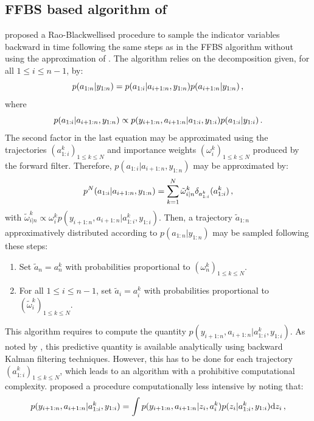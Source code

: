 \subsection{FFBS based algorithm of \cite{lindsten:bunch:sarkka:schon:godsill:2015,sarkka:bunch:godsill:2012,lindsten:bunch:godsill:schon:2013}}
\cite{lindsten:bunch:sarkka:schon:godsill:2015,sarkka:bunch:godsill:2012,lindsten:bunch:godsill:schon:2013} proposed a Rao-Blackwellised procedure to sample the indicator variables backward in time following the same steps as in the FFBS algorithm without using the approximation of \cite{kim:1994}. The algorithm relies on the decomposition given, for all $1\le i \le n-1$, by:
\[
p(a_{1:n}|y_{1:n}) = p(a_{1:i}|a_{i+1:n},y_{1:n})p(a_{i+1:n}|y_{1:n})\,,
\]
where
\[
p(a_{1:i}|a_{i+1:n},y_{1:n}) \propto p(y_{i+1:n},a_{i+1:n}|a_{1:i},y_{1:i})p(a_{1:i}|y_{1:i})\,.
\]
The second factor in the last equation may be approximated using the trajectories $(a^k_{1:i})_{1\le k \le N}$ and importance weights $(\omega^k_{i})_{1\le k \le N}$ produced by the forward filter. Therefore, $p(a_{1:i}|a_{i+1:n},y_{1:n})$ may be approximated by:
\[
p^N(a_{1:i}|a_{i+1:n},y_{1:n}) = \sum_{k=1}^N \tilde{\omega}^k_{i|n}\delta_{a^k_{1:i}}(a^k_{1:i})\,,
\]
with $\tilde{\omega}^k_{i|n} \propto \omega_i^k p(y_{i+1:n},a_{i+1:n}|a^k_{1:i},y_{1:i})$. Then, a trajectory $\tilde{a}_{1:n}$ approximatively distributed according to $p(a_{1:n}|y_{1:n})$ may be sampled following these steps:
\begin{enumerate}[-]
\item Set $\tilde{a}_n= a_n^k$ with probabilities proportional to $(\omega_n^k)_{1\le k \le N}$.
\item For all $1\le i\le n-1$, set $\tilde{a}_i = a_i^k$ with probabilities proportional to $(\tilde{\omega}_i^k)_{1\le k \le N}$.
\end{enumerate}
This algorithm requires to compute the quantity  $p(y_{i+1:n},a_{i+1:n}|a^k_{1:i},y_{1:i})$. As noted by \cite{lindsten:bunch:sarkka:schon:godsill:2015}, this predictive quantity is available analytically using backward Kalman filtering techniques. However, this has to be done for each trajectory $(a^k_{1:i})_{1\le k \le N}$, which leads to an algorithm with a prohibitive computational complexity. \cite{lindsten:bunch:sarkka:schon:godsill:2015} proposed a procedure computationally less intensive by noting that:
\begin{equation}
\label{eq:FFBS:incremental}
p(y_{i+1:n},a_{i+1:n}|a^k_{1:i},y_{1:i}) = \int p(y_{i+1:n},a_{i+1:n}|z_i,a^k_{i})p(z_{i}|a^k_{1:i},y_{1:i})\mathrm{d} z_i\,,
\end{equation}
